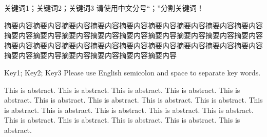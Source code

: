 
\begin{cnabstract}{关键词1；关键词2；关键词3}
  请使用中文分号“；”分割关键词！

  摘要内容摘要内容摘要内容摘要内容摘要内容摘要内容摘要内容摘要内容摘要内容摘要内容摘要内容摘要内容摘要内容摘要内容摘要内容摘要内容摘要内容摘要内容摘要内容摘要内容摘要内容摘要内容摘要内容摘要内容摘要内容摘要内容摘要内容摘要内容摘要内容摘要内容摘要内容摘要内容摘要内容
\end{cnabstract}


\begin{enabstract}{Key1; Key2; Key3}
  Please use English semicolon and space to separate key words.

  This is abstract. This is abstract. This is abstract. This is abstract. This is abstract. This is abstract. This is abstract. This is abstract. This is abstract. This is abstract. This is abstract. This is abstract. This is abstract. This is abstract. This is abstract. This is abstract. This is abstract. This is abstract. This is abstract. 
\end{enabstract}
